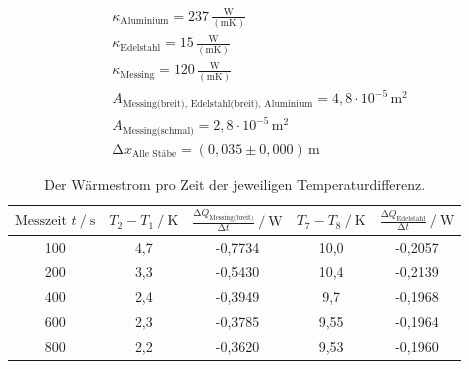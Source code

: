 \begin{align*}
    \kappa_{\text{Aluminium}} = 237\,\frac{\unit{\watt}}{(\unit{\meter\kelvin})}\\
    \kappa_{\text{Edelstahl}} = 15\,\frac{\unit{\watt}}{(\unit{\meter\kelvin})}\\
    \kappa_{\text{Messing}} = 120\,\frac{\unit{\watt}}{(\unit{\meter\kelvin})}\\
    A_{\text{Messing(breit), Edelstahl(breit), Aluminium}} = 4,8 \cdot 10^{-5}\,\unit{\meter^2} \\
    A_{\text{Messing(schmal)}} = 2,8 \cdot 10^{-5}\,\unit{\meter^2}\\
    \increment x_{\text{Alle Stäbe}} = (0,035 \pm 0,000)\,\unit{\meter} 
\end{align*}

\begin{table}[H]
    \centering
    \caption{Der Wärmestrom pro Zeit der jeweiligen Temperaturdifferenz.}
    \label{Tabelle1}
    \begin{tabular} {c     c     c     c     c}
        \toprule
        {$ \text{Messzeit}\,\, t \mathbin{/} \unit{\second} $} &
        {$ T_{2} - T_{1} \mathbin{/} \unit{\kelvin}$} &
        {$ \frac{\increment Q_{\text{Messing(breit)}}}{\increment t}  \mathbin{/} \unit{\watt} $} &
        {$ T_{7} - T_{8}  \mathbin{/} \unit{\kelvin} $} &
        {$ \frac{\increment Q_{\text{Edelstahl}}}{\increment t}  \mathbin{/} \unit{\watt} $} \\
        \midrule
        100 & 4,7 & -0,7734 & 10,0 & -0,2057 \\
        200 & 3,3 & -0,5430 & 10,4 & -0,2139 \\
        400 & 2,4 & -0,3949 & 9,7  & -0,1968 \\
        600 & 2,3 & -0,3785 & 9,55 & -0,1964 \\
        800 & 2,2 & -0,3620 & 9,53 & -0,1960 \\
        \bottomrule
    \end{tabular} 
\end{table}

